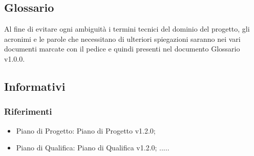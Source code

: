 \subsection{Glossario}
Al fine di evitare ogni ambiguità i termini tecnici del dominio del progetto, gli acronimi e le parole che necessitano di ulteriori spiegazioni saranno nei vari documenti marcate con il pedice  e quindi presenti nel documento Glossario v1.0.0.

\subsection{Informativi}
\subsubsection{Riferimenti}
\begin{itemize}
\item
Piano di Progetto: Piano di Progetto v1.2.0;
\item
Piano di Qualifica: Piano di Qualifica v1.2.0;
.....
\end{itemize}